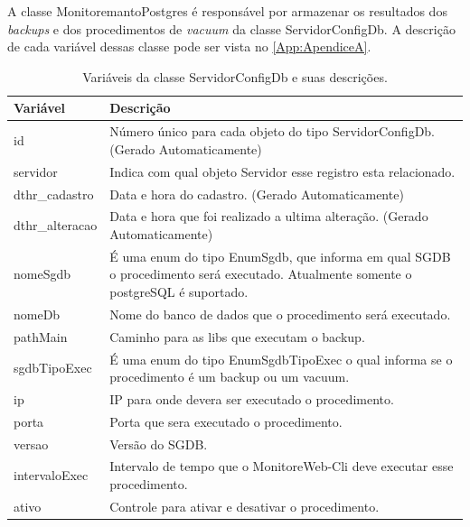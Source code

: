 A classe MonitoremantoPostgres é responsável por armazenar os resultados dos \textit{backups} e dos procedimentos de \textit{vacuum} da classe ServidorConfigDb. A descrição de cada variável dessas classe pode ser vista no \autoref{App:ApendiceA}.

\begin{table}[H]
\centering
\begin{tabular}{|l|l|}
\hline
{\color[HTML]{000000} \textbf{Variável}} & {\color[HTML]{000000} \textbf{Descrição}}\\ \hline
id                                       & \multicolumn{1}{p{12.50cm}|}{Número único para cada objeto do tipo ServidorConfigDb. (Gerado Automaticamente) }\\ \hline
servidor                                 & \multicolumn{1}{p{12.50cm}|}{Indica com qual objeto Servidor esse registro esta relacionado.}\\ \hline
dthr\_cadastro                           & \multicolumn{1}{p{12.50cm}|}{Data e hora do cadastro. (Gerado Automaticamente) } \\ \hline
dthr\_alteracao                          & \multicolumn{1}{p{12.50cm}|}{Data e hora que foi realizado a ultima alteração. (Gerado Automaticamente)}\\ \hline
nomeSgdb                                 & \multicolumn{1}{p{12.50cm}|}{É uma enum do tipo EnumSgdb, que informa em qual SGDB o procedimento será executado. Atualmente somente o postgreSQL é suportado. }\\ \hline
nomeDb                                   & \multicolumn{1}{p{12.50cm}|}{Nome do banco de dados que o procedimento será executado.}\\ \hline
pathMain                                 & \multicolumn{1}{p{12.50cm}|}{Caminho para as libs que executam o backup.}\\ \hline
sgdbTipoExec                             & \multicolumn{1}{p{12.50cm}|}{É uma enum do tipo EnumSgdbTipoExec o qual informa se o procedimento é um backup ou um vacuum.} \\ \hline
ip                                       & \multicolumn{1}{p{12.50cm}|}{IP para onde devera ser executado o procedimento. }\\ \hline
porta                                    & \multicolumn{1}{p{12.50cm}|}{Porta que sera executado o procedimento. }\\ \hline
versao                                   & \multicolumn{1}{p{12.50cm}|}{Versão do SGDB.}\\ \hline
intervaloExec                            & \multicolumn{1}{p{12.50cm}|}{Intervalo de tempo que o MonitoreWeb-Cli deve executar esse procedimento.}\\ \hline
ativo                                    & \multicolumn{1}{p{12.50cm}|}{Controle para ativar e desativar o procedimento.}\\ \hline
\end{tabular}
\caption[Variáveis da classe ServidorConfigDb e suas descrições.]{Variáveis da classe ServidorConfigDb e suas descrições.}
\label{Tab:VariaveisServidorConfigDb}
\end{table}

